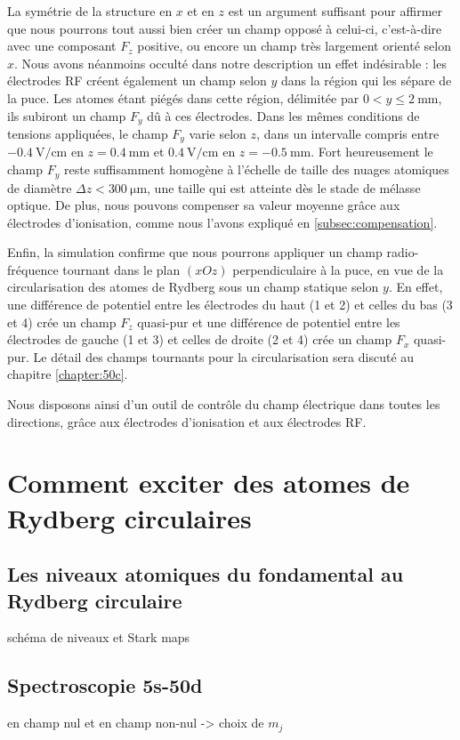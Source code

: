 La symétrie de la structure en $x$ et en $z$ est un argument suffisant pour affirmer que nous pourrons tout aussi bien créer un champ opposé à celui-ci, c'est-à-dire avec une composant $F_z$ positive, ou encore un champ très largement orienté selon $x$.
Nous avons néanmoins occulté dans notre description un effet indésirable :
les électrodes RF créent également un champ selon $y$ dans la région qui les sépare de la puce.
Les atomes étant piégés dans cette région, délimitée par $\num{0} < y \leq \SI{2}{\mm}$, ils subiront un champ $F_y$ dû à ces électrodes.
Dans les mêmes conditions de tensions appliquées, le champ $F_y$ varie selon $z$, dans un intervalle compris entre $\SI{-0.4}{\V/\cm}$ en $z=\SI{+0.4}{\mm}$ et $\SI{+0.4}{\V/\cm}$ en $z=\SI{-0.5}{\mm}$.
Fort heureusement le champ $F_y$ reste suffisamment homogène à l'échelle de taille des nuages atomiques de diamètre $\Delta z < \SI{300}{\um}$, une taille qui est atteinte dès le stade de mélasse optique.
De plus, nous pouvons compenser sa valeur moyenne grâce aux électrodes d'ionisation, comme nous l'avons expliqué en \ref{subsec:compensation}.

Enfin, la simulation confirme que nous pourrons appliquer un champ radio-fréquence tournant dans le plan $(xOz)$ perpendiculaire à la puce, en vue de la circularisation des atomes de Rydberg sous un champ statique selon $y$.
En effet, une différence de potentiel entre les électrodes du haut (1 et 2) et celles du bas (3 et 4) crée un champ $F_z$ quasi-pur et une différence de potentiel entre les électrodes de gauche (1 et 3) et celles de droite (2 et 4) crée un champ $F_x$ quasi-pur.
Le détail des champs tournants pour la circularisation sera discuté au chapitre \ref{chapter:50c}.


Nous disposons ainsi d'un outil de contrôle du champ électrique dans toutes les directions, grâce aux électrodes d'ionisation et aux électrodes RF.


\section{Comment exciter des atomes de Rydberg circulaires}
	\subsection{Les niveaux atomiques du fondamental au Rydberg circulaire}
		\noindent schéma de niveaux et Stark maps
	\subsection{Spectroscopie 5s-50d}
		\noindent en champ nul et en champ non-nul -> choix de $m_j$
